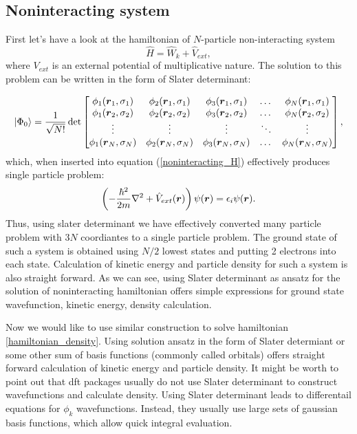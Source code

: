 \message{ !name(document.tex)}\documentclass[openany, longbibliography,slovene,a4paper,12pt]{article}
\def\vec#1{\mbox{\boldmath$#1$}}
\begin{document}
\subsection{Noninteracting system}
 First let's have a look at the hamiltonian of $N$-particle non-interacting system
 \begin{equation} \label{noninteracting_H}
   \hat H =\hat  W_k + \hat V_{ext}, 
 \end{equation}
 where $V_{ext}$ is an external potential of multiplicative nature. The solution
 to this problem can be written in the form of Slater determinant:

 \[
       \ket{\Phi_0} = \frac{1}{\sqrt{N!}}\det 
   \begin{bmatrix}
   \phi_{1}(\vec r_1, \sigma_1) & \phi_{2}(\vec r_1, \sigma_1) & \phi_{3}(\vec
   r_1, \sigma_1) & \dots & \phi_{N}(\vec r_1, \sigma_1) \\
    \phi_{1}(\vec r_2, \sigma_2) & \phi_{2}(\vec r_2, \sigma_2) & \phi_{3}(\vec
    r_2, \sigma_2) & \dots & \phi_{N}(\vec r_2, \sigma_2) \\
    \vdots & \vdots & \vdots & \ddots & \vdots \\
     \phi_{1}(\vec r_N, \sigma_N) & \phi_{2}(\vec r_N, \sigma_N) & \phi_{3}(\vec r_N, \sigma_N) & \dots & \phi_{N}(\vec r_N, \sigma_N) \\
\end{bmatrix},
\]
 which, when inserted into equation (\ref{noninteracting_H}) effectively produces
 single particle problem:
 \begin{equation}
   \left(-\frac{\hbar^2}{2m}\nabla^2 + \hat V_{ext}(\vec r)\right) \psi (\vec r) = \epsilon_i \psi(\vec r).
 \end{equation}
 Thus, using slater determinant we have effectively converted many particle
 problem with $3N$ coordiantes to a single particle problem.
 The ground state of such a system is obtained using $N/2$ lowest states and
 putting 2 electrons into each state. Calculation of kinetic energy and particle
 density for such a system is also straight forward. As we can see, using Slater
 determinant as ansatz for the solution of noninteracting hamiltonian offers
 simple expressions for ground state wavefunction, kinetic energy, density
 calculation.  

Now we would like to use similar construction to solve hamiltonian
\ref{hamiltonian_density}. Using solution ansatz in the form of Slater
determiant or some other sum of basis functions (commonly called orbitals) offers straight forward
calculation of kinetic energy and  particle density. It might be worth to point
out that dft packages usually do not use Slater determinant to construct
wavefunctions and calculate density. Using Slater determinant leads to
differentail equations for $\phi_k$ wavefunctions. Instead, they usually use
large sets of gaussian basis functions, which allow quick integral evaluation.
 
\end{document}
